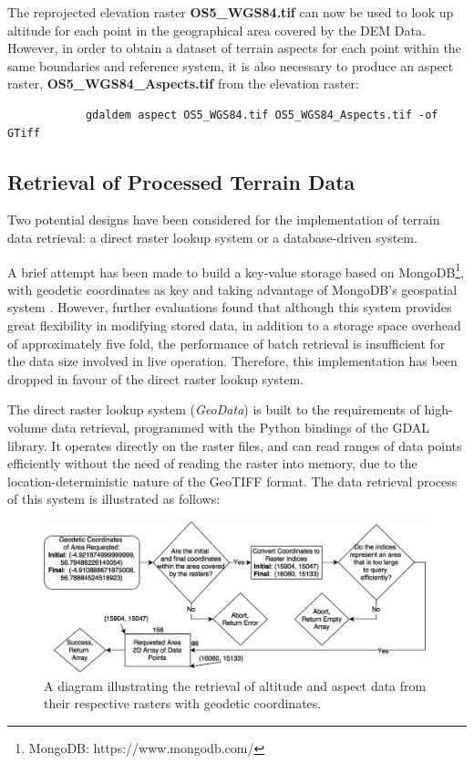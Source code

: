 \documentclass[11pt, oneside]{article}
\begin{document}
		The reprojected elevation raster \textbf{OS5\_WGS84.tif} can now be used to look up altitude for each point in the geographical area covered by the DEM Data. However, in order to obtain a dataset of terrain aspects for each point within the same boundaries and reference system, it is also necessary to produce an aspect raster, \textbf{OS5\_WGS84\_Aspects.tif} from the elevation raster:
		\begin{verbatim}
			gdaldem aspect OS5_WGS84.tif OS5_WGS84_Aspects.tif -of GTiff
		\end{verbatim}
		
	\subsection{Retrieval of Processed Terrain Data}
		Two potential designs have been considered for the implementation of terrain data retrieval: a direct raster lookup system or a database-driven system. 
		
		A brief attempt has been made to build a key-value storage based on MongoDB\footnote{MongoDB: https://www.mongodb.com/}, with geodetic coordinates as key and taking advantage of MongoDB's geospatial system \cite{mongodb-spatial}. However, further evaluations found that although this system provides great flexibility in modifying stored data, in addition to a storage space overhead of approximately five fold, the performance of batch retrieval is insufficient for the data size involved in live operation. Therefore, this implementation has been dropped in favour of the direct raster lookup system.
		
		The direct raster lookup system (\textit{GeoData}) is built to the requirements of high-volume data retrieval, programmed with the Python bindings of the GDAL library. It operates directly on the raster files, and can read ranges of data points efficiently without the need of reading the raster into memory, due to the location-deterministic nature of the GeoTIFF format.  The data retrieval process of this system is illustrated as follows:
		\begin{figure}[h]
		\centering
		\includegraphics[scale=0.3]{Retrieval.png}
		\caption{\label{fig:retrieval}A diagram illustrating the retrieval of altitude and aspect data from their respective rasters with geodetic coordinates.}
		\end{figure}
		
\end{document}
